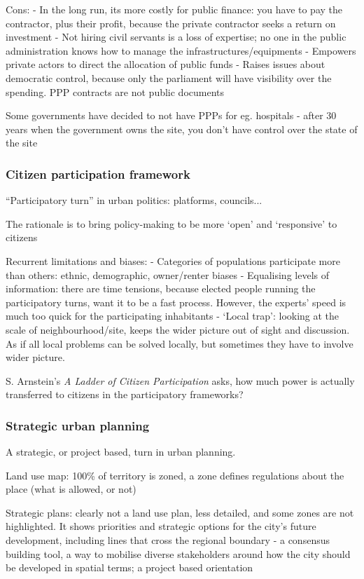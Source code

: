 \documentclass{article}
\begin{document}
Cons:
- In the long run, its more costly for public finance: you have to pay the contractor, plus their profit, because the private contractor seeks a return on investment
- Not hiring civil servants is a loss of expertise; no one in the public administration knows how to manage the infrastructures/equipments
- Empowers private actors to direct the allocation of public funds
- Raises issues about democratic control, because only the parliament will have visibility over the spending. PPP contracts are not public documents

Some governments have decided to not have PPPs for eg. hospitals - after 30 years when the government owns the site, you don't have control over the state of the site

\subsubsection{Citizen participation framework}

``Participatory turn'' in urban politics: platforms, councils...

The rationale is to bring policy-making to be more `open' and `responsive' to citizens

Recurrent limitations and biases:
- Categories of populations participate more than others: ethnic, demographic, owner/renter biases
- Equalising levels of information: there are time tensions, because elected people running the participatory turns, want it to be a fast process. However, the experts' speed is much too quick for the participating inhabitants
- `Local trap': looking at the scale of neighbourhood/site, keeps the wider picture out of sight and discussion. As if all local problems can be solved locally, but sometimes they have to involve wider picture.

S. Arnstein's \textit{A Ladder of Citizen Participation} asks, how much power is actually transferred to citizens in the participatory frameworks?

\subsubsection{Strategic urban planning}

A strategic, or project based, turn in urban planning. 

Land use map: 100\% of territory is zoned, a zone defines regulations about the place (what is allowed, or not)

Strategic plans: clearly not a land use plan, less detailed, and some zones are not highlighted. It shows priorities and strategic options for the city's future development, including lines that cross the regional boundary
- a consensus building tool, a way to mobilise diverse stakeholders around how the city should be developed in spatial terms; a project based orientation
\end{document}
